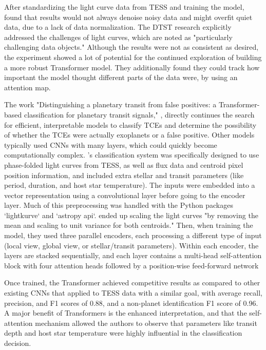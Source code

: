 \documentclass[letterpaper]{article} %
\begin{document}
After standardizing the light curve data from TESS and training the model, \citeauthor{morvan2022dontpayattentionnoise} found that results would not always denoise noisy data and might overfit quiet data, due to a lack of data normalization. The DTST research explicitly addressed the challenges of light curves, which are noted as "particularly challenging data objects." Although the results were not as consistent as desired, the experiment showed a lot of potential for the continued exploration of building a more robust Transformer model. They additionally found they could track how important the model thought different parts of the data were, by using an attention map.

The work "Distinguishing a planetary transit from false positives: a Transformer-based classification for planetary transit signals," \cite{salinas2023distinguishingtransitfalsepositives}, directly continues the search for efficient, interpretable models to classify TCEs and determine the possibility of whether the TCEs were actually exoplanets or a false positive. Other models typically used CNNs with many layers, which could quickly become computationally complex. \citeauthor{salinas2023distinguishingtransitfalsepositives}'s classification system was specifically designed to use phase-folded light curves from TESS, as well as flux data and centroid pixel position information, and included extra stellar and transit parameters (like period, duration, and host star temperature). The inputs were embedded into a vector representation using a convolutional layer before going to the encoder layer. Much of this preprocessing was handled with the Python packages `lightkurve` and `astropy api`. \citeauthor{salinas2023distinguishingtransitfalsepositives} ended up scaling the light curves "by removing the mean and scaling to unit variance for both centroids." Then, when training the model, they used three parallel encoders, each processing a different type of input (local view, global view, or stellar/transit parameters). Within each encoder, the layers are stacked sequentially, and each layer contains a multi-head self-attention block with four attention heads followed by a position-wise feed-forward network

Once trained, the Transformer achieved competitive results as compared to other existing CNNs that applied to TESS data with a similar goal, with average recall, precision, and F1 scores of 0.88, and a non-planet identification F1 score of 0.96. A major benefit of Transformers is the enhanced interpretation, and that the self-attention mechanism allowed the authors to observe that parameters like transit depth and host star temperature were highly influential in the classification decision. 
\end{document}
